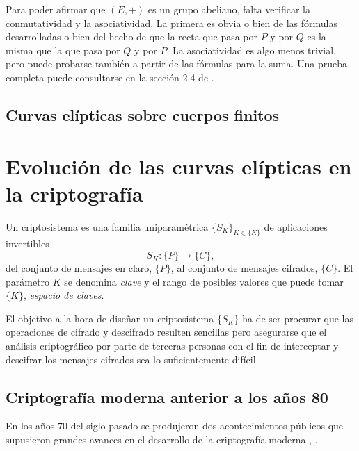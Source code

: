 \documentclass[
  a4paper,
  12pt,
  spanish,
]{scrartcl}
\begin{document}
    Para poder afirmar que $(E, +)$ es un grupo abeliano, falta verificar la conmutatividad y la asociatividad. La primera es obvia o bien de las fórmulas desarrolladas o bien del hecho de que la recta que pasa por $P$ y por $Q$ es la misma que la que pasa por $Q$ y por $P$. La asociatividad es algo menos trivial, pero puede probarse también a partir de las fórmulas para la suma. Una prueba completa puede consultarse en la sección 2.4 de \parencite{elliptic_washington_2008}.
    
    
    
\subsection{Curvas elípticas sobre cuerpos finitos}




\section{Evolución de las curvas elípticas en la criptografía}

Un criptosistema es una familia uniparamétrica \(\{S_K\}_{K \in \{K\}}\) de aplicaciones invertibles \[S_K: \{P\} \to \{C\},\] del conjunto de mensajes en claro, \(\{P\}\), al conjunto de mensajes cifrados, \(\{C\}\). 
El parámetro \(K\) se denomina \textit{clave} y el rango de posibles valores que puede tomar \(\{K\}\), \textit{espacio de claves}.

El objetivo a la hora de diseñar un criptosistema \(\{S_K\}\) ha de ser procurar que las operaciones de cifrado y descifrado resulten sencillas pero asegurarse que el análisis criptográfico por parte de terceras personas con el fin de interceptar y descifrar los mensajes cifrados sea lo suficientemente difícil.

\subsection{Criptografía moderna anterior a los años 80}



En los años 70 del siglo pasado se produjeron dos acontecimientos públicos que supusieron grandes avances en el desarrollo de la criptografía moderna \parencite{singh_code_2003}, \parencite{thawte_history_2013}.
\end{document}
